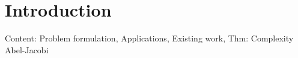 \documentclass[main.tex]{subfiles}
\begin{document}
  \section{Introduction}

  Content: Problem formulation, Applications, Existing work, Thm: Complexity Abel-Jacobi
\end{document}
